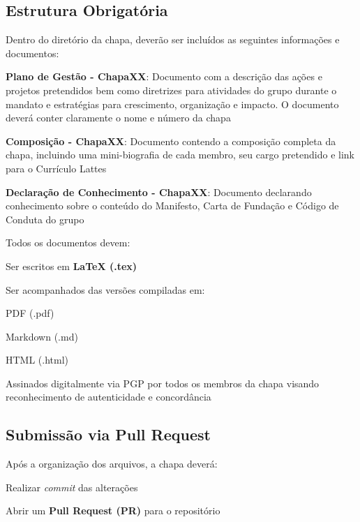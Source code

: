 \documentclass[
  12pt,          %
  a4paper,       %
  oneside,       %
  brazil         %
]{article}
\begin{document}
\subsection{Estrutura Obrigatória}

Dentro do diretório da chapa, deverão ser incluídos as seguintes informações e documentos:

\begin{conduta}
	\item \textbf{Plano de Gestão - ChapaXX}: Documento com a descrição das ações e projetos pretendidos bem como diretrizes para atividades do grupo 
	durante o mandato e estratégias para crescimento, organização e impacto. O documento deverá conter claramente o nome e número da chapa 
	\item \textbf{Composição - ChapaXX}: Documento contendo a composição completa da chapa, incluindo uma mini-biografia de cada membro, seu cargo pretendido 
	e link para o Currículo Lattes
	\item \textbf{Declaração de Conhecimento - ChapaXX}: Documento declarando conhecimento sobre o conteúdo do Manifesto, Carta de Fundação e Código de Conduta do grupo
	
\end{conduta}

Todos os documentos devem:

\begin{conduta}
	\item Ser escritos em \textbf{LaTeX (.tex)}
	\item Ser acompanhados das versões compiladas em:
	\begin{conduta}
		\item PDF (.pdf)
		\item Markdown (.md)
		\item HTML (.html)
	\item Assinados digitalmente via PGP por todos os membros da chapa visando reconhecimento de autenticidade e concordância
	\end{conduta}
\end{conduta}

\subsection{Submissão via Pull Request}

Após a organização dos arquivos, a chapa deverá:

\begin{numerado}
	\item Realizar \textit{commit} das alterações
	\item Abrir um \textbf{Pull Request (PR)} para o repositório
\end{numerado}
\end{document}
